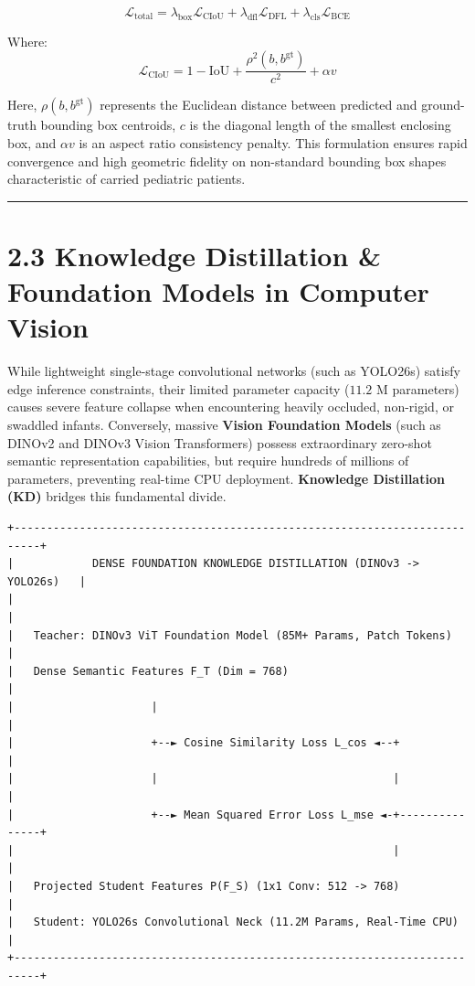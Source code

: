 \[\mathcal{L}_{\text{total}} = \lambda_{\text{box}} \mathcal{L}_{\text{CIoU}} + \lambda_{\text{dfl}} \mathcal{L}_{\text{DFL}} + \lambda_{\text{cls}} \mathcal{L}_{\text{BCE}}\]

Where:
\[\mathcal{L}_{\text{CIoU}} = 1 - \text{IoU} + \frac{\rho^2(b, b^{\text{gt}})}{c^2} + \alpha v\]

Here, \(\rho(b, b^{\text{gt}})\) represents the Euclidean distance
between predicted and ground-truth bounding box centroids, \(c\) is the
diagonal length of the smallest enclosing box, and \(\alpha v\) is an
aspect ratio consistency penalty. This formulation ensures rapid
convergence and high geometric fidelity on non-standard bounding box
shapes characteristic of carried pediatric patients.

\begin{center}\rule{0.5\linewidth}{0.5pt}\end{center}

\section{2.3 Knowledge Distillation \& Foundation Models in Computer
Vision}\label{knowledge-distillation-foundation-models-in-computer-vision}

While lightweight single-stage convolutional networks (such as YOLO26s)
satisfy edge inference constraints, their limited parameter capacity
(\(11.2\text{ M}\) parameters) causes severe feature collapse when
encountering heavily occluded, non-rigid, or swaddled infants.
Conversely, massive \textbf{Vision Foundation Models} (such as DINOv2
and DINOv3 Vision Transformers) possess extraordinary zero-shot semantic
representation capabilities, but require hundreds of millions of
parameters, preventing real-time CPU deployment. \textbf{Knowledge
Distillation (KD)} bridges this fundamental divide.

\begin{verbatim}
+--------------------------------------------------------------------------+
|            DENSE FOUNDATION KNOWLEDGE DISTILLATION (DINOv3 -> YOLO26s)   |
|                                                                          |
|   Teacher: DINOv3 ViT Foundation Model (85M+ Params, Patch Tokens)       |
|   Dense Semantic Features F_T (Dim = 768)                                |
|                     |                                                    |
|                     +--► Cosine Similarity Loss L_cos ◄--+               |
|                     |                                    |               |
|                     +--► Mean Squared Error Loss L_mse ◄-+---------------+
|                                                          |               |
|   Projected Student Features P(F_S) (1x1 Conv: 512 -> 768)               |
|   Student: YOLO26s Convolutional Neck (11.2M Params, Real-Time CPU)      |
+--------------------------------------------------------------------------+
\end{verbatim}

